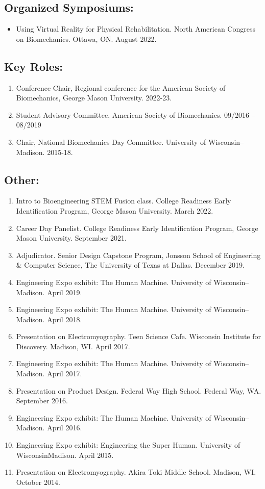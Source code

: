 \documentclass[letterpaper, 10pt]{article}
\begin{document}
\subsection{Organized Symposiums:}
\begin{itemize}
     \item Using Virtual Reality for Physical Rehabilitation. North American Congress on Biomechanics. Ottawa, ON. August 2022.
\end{itemize}


\subsection{Key Roles:}
\begin{enumerate}
    \item Conference Chair, Regional conference for the American Society of Biomechanics, George Mason University. 2022-23.  
    \item Student Advisory Committee, American Society of Biomechanics. 09/2016 – 08/2019
    \item Chair, National Biomechanics Day Committee. University of Wisconsin--Madison. 2015-18.
\end{enumerate}

\subsection{Other:}
\begin{enumerate}
    \item Intro to Bioengineering STEM Fusion class. College Readiness Early Identiﬁcation Program, George Mason University. March 2022.
    \item Career Day Panelist. College Readiness Early Identiﬁcation Program, George Mason University. September 2021.
    \item Adjudicator. Senior Design Capstone Program, Jonsson School of Engineering \& Computer Science, The University of Texas at Dallas. December 2019.
    \item Engineering Expo exhibit: The Human Machine. University of Wisconsin--Madison. April 2019.
    \item Engineering Expo exhibit: The Human Machine. University of Wisconsin–Madison. April 2018.
    \item Presentation on Electromyography. Teen Science Cafe. Wisconsin Institute for Discovery. Madison, WI. April 2017.
    \item Engineering Expo exhibit: The Human Machine. University of Wisconsin--Madison. April 2017.
    \item Presentation on Product Design. Federal Way High School. Federal Way, WA. September 2016.
    \item Engineering Expo exhibit: The Human Machine. University of Wisconsin--Madison. April 2016.
    \item Engineering Expo exhibit: Engineering the Super Human. University of WisconsinMadison. April 2015.
    \item Presentation on Electromyography. Akira Toki Middle School. Madison, WI. October 2014.
\end{enumerate}
\end{document}

